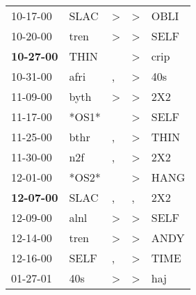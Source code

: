 \begin{supertabular}{p{0.07\textwidth}p{0.06\textwidth}p{0.02\textwidth}p{0.02\textwidth}p{0.06\textwidth}}
          10-17-00\textsuperscript{} &           SLAC\textsuperscript{} &     \textgreater &     \textgreater &           OBLI\textsuperscript{} \\
          10-20-00\textsuperscript{} &           tren\textsuperscript{} &     \textgreater &     \textgreater &           SELF\textsuperscript{} \\
 \textbf{10-27-00\textsuperscript{}} &           THIN\textsuperscript{} &                  &     \textgreater &           crip\textsuperscript{} \\
          10-31-00\textsuperscript{} &           afri\textsuperscript{} &                , &     \textgreater &            40s\textsuperscript{} \\
          11-09-00\textsuperscript{} &           byth\textsuperscript{} &     \textgreater &     \textgreater &            2X2\textsuperscript{} \\
          11-17-00\textsuperscript{} &                            *OS1* &                  &     \textgreater &           SELF\textsuperscript{} \\
          11-25-00\textsuperscript{} &           bthr\textsuperscript{} &                , &     \textgreater &           THIN\textsuperscript{} \\
          11-30-00\textsuperscript{} &            n2f\textsuperscript{} &                , &     \textgreater &            2X2\textsuperscript{} \\
          12-01-00\textsuperscript{} &                            *OS2* &                  &     \textgreater &           HANG\textsuperscript{} \\
 \textbf{12-07-00\textsuperscript{}} &           SLAC\textsuperscript{} &                , &                , &            2X2\textsuperscript{} \\
          12-09-00\textsuperscript{} &           alnl\textsuperscript{} &     \textgreater &     \textgreater &           SELF\textsuperscript{} \\
          12-14-00\textsuperscript{} &           tren\textsuperscript{} &     \textgreater &     \textgreater &           ANDY\textsuperscript{} \\
          12-16-00\textsuperscript{} &           SELF\textsuperscript{} &                , &     \textgreater &           TIME\textsuperscript{} \\
          01-27-01\textsuperscript{} &            40s\textsuperscript{} &     \textgreater &     \textgreater &            haj\textsuperscript{} \\

\end{supertabular}
